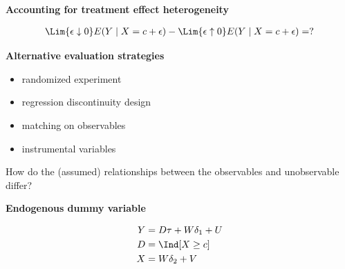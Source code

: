 \begin{frame}\textbf{Accounting for treatment effect heterogeneity}\vspace{0.3cm}

\begin{align*}
\Lim{\epsilon \downarrow 0} E(Y\mid X = c + \epsilon) -
\Lim{\epsilon \uparrow 0} E(Y\mid X = c + \epsilon) = ?
\end{align*}

\end{frame}
\begin{frame}\textbf{Alternative evaluation strategies}\vspace{0.3cm}

\begin{itemize}\setlength\itemsep{1em}
\item randomized experiment
\item regression discontinuity design
\item matching on observables
\item instrumental variables\vspace{0.3cm}
\end{itemize}

How do the (assumed) relationships between the observables and unobservable differ?

\end{frame}
\begin{frame}\textbf{Endogenous dummy variable}\vspace{0.3cm}

\begin{align*}
Y & = D \tau + W \delta_1 + U \\
D & = \Ind[X \geq c] \\
X & = W \delta_2 + V
\end{align*}

\end{frame}

